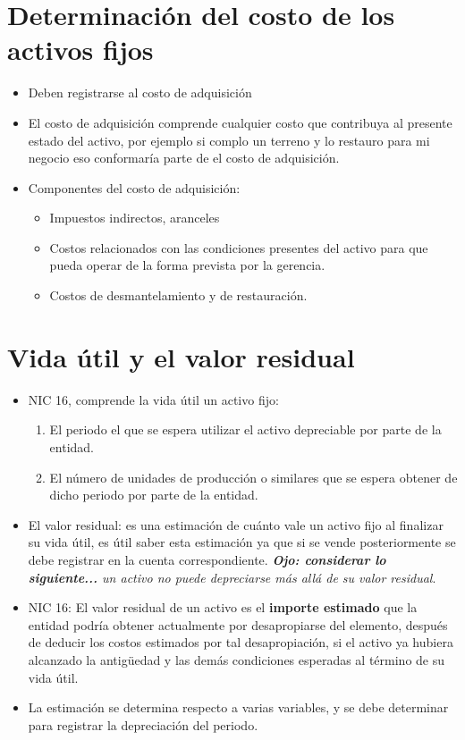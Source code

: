 \documentclass{article}
\begin{document}
\section{Determinación del costo de los activos fijos}
\begin{itemize}
    \item Deben registrarse al costo de adquisición
    \item El costo de adquisición comprende cualquier costo que contribuya al presente estado del activo, por ejemplo si complo un terreno y lo restauro para mi negocio eso conformaría parte de el costo de adquisición.
    \item Componentes del costo de adquisición:
        \begin{itemize}
            \item Impuestos indirectos, aranceles
            \item Costos relacionados con las condiciones presentes del activo para que pueda operar de la forma prevista por la gerencia.
            \item Costos de desmantelamiento y de restauración.
        \end{itemize}
\end{itemize}


\section{Vida útil y el valor residual}
\begin{itemize}
    \item NIC 16, comprende la vida útil un activo fijo:
        \begin{enumerate}
            \item El periodo el que se espera utilizar el activo depreciable por parte de la entidad.
            \item El número de unidades de producción o similares que se espera obtener de dicho periodo por parte de la entidad.
        \end{enumerate}
    
    \item El valor residual: es una estimación de cuánto vale un activo fijo al finalizar su vida útil, es útil saber esta estimación ya que si se vende posteriormente se debe registrar en la cuenta correspondiente. \emph{\textbf{Ojo: considerar lo siguiente...} un activo no puede depreciarse más allá de su valor residual}.

    \item  NIC 16: El valor residual  de un activo es el \textbf{importe estimado} que la entidad podría obtener actualmente por desapropiarse del elemento, después de deducir los costos estimados por tal desapropiación, si el activo ya hubiera alcanzado la antigüedad y las demás condiciones esperadas al término de su vida útil. 
    \item La estimación se determina respecto a varias variables, y se debe determinar para registrar la depreciación del periodo.
\end{itemize}
\end{document}
